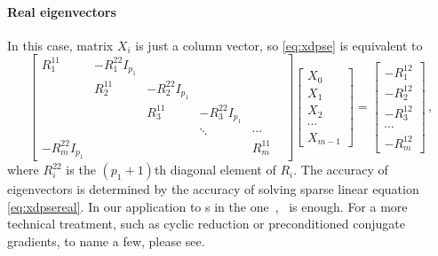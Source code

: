 \paragraph{Real eigenvectors}
In this case, matrix $X_{i}$ is just a column vector, so
\eqref{eq:xdpse} is equivalent to
\begin{equation}
  \label{eq:xdpsereal}
  \begin{bmatrix}
    R^{11}_{1} & -R^{22}_{1}I_{p_{1}} &  & \\[1em]
    & R^{11}_{2} & -R^{22}_{2}I_{p_{1}} &  &\\[1em]
    &  & R^{11}_{3} & -R^{22}_{3}I_{p_{1}} &  &\\[1em]
    & & & \ddots &\cdots & \\[1em]
    -R^{22}_{m}I_{p_{1}} & & & & R^{11}_{m}
  \end{bmatrix}
  \begin{bmatrix}
    X_{0} \\[1em]
    X_{1}  \\[1em]
    X_{2}  \\[1em]
    \cdots \\[1em]
    X_{m-1}
  \end{bmatrix}
  =
  \begin{bmatrix}
    -R^{12}_{1} \\[1em]
    -R^{12}_{2} \\[1em]
    -R^{12}_{3} \\[1em]
    \cdots \\[1em]
    -R^{12}_{m}
  \end{bmatrix}
  \,,
\end{equation}
where $R^{22}_{i}$ is the $(p_{1}+1)$th diagonal element of $R_{i}$.
The accuracy of eigenvectors is determined by the accuracy of
solving sparse linear equation \eqref{eq:xdpsereal}. In our application
to \po s in the one\dmn\ \KSe, \Gepp\ is enough. For a more
technical treatment, such as cyclic reduction or preconditioned conjugate
gradients, to name a few, please see.

